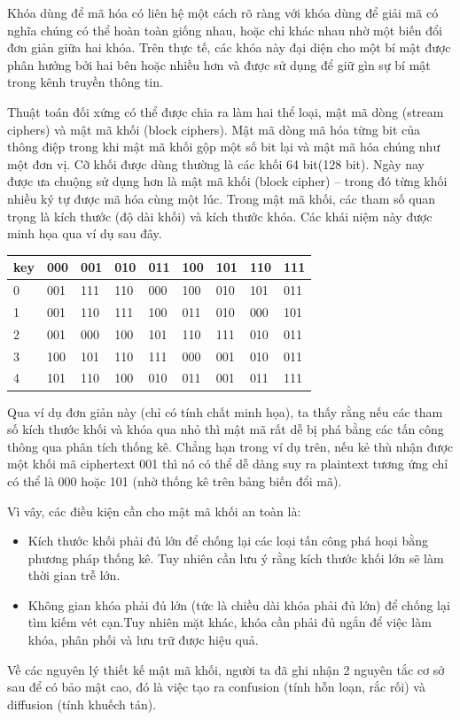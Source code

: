 \documentclass[a4paper,12pt]{report}
\begin{document}
Khóa dùng để mã hóa có liên hệ một cách rõ ràng với khóa dùng để giải mã có nghĩa chúng có thể hoàn toàn giống nhau, hoặc chỉ khác nhau nhờ một biến đổi đơn giản giữa hai khóa. Trên thực tế, các khóa này đại diện cho một bí mật được phân hưởng bởi hai bên hoặc nhiều hơn và được sử dụng để giữ gìn sự bí mật trong kênh truyền thông tin.

Thuật toán đối xứng có thể được chia ra làm hai thể loại, mật mã dòng (stream ciphers) và mật mã khối (block ciphers). Mật mã dòng mã hóa từng bit của thông điệp trong khi mật mã khối gộp một số bit lại và mật mã hóa chúng như một đơn vị. Cỡ khối được dùng thường là các khối 64 bit(128 bit). Ngày nay được ưa chuộng sử dụng hơn là mật mã khối (block cipher) -- trong đó từng khối nhiều ký tự được mã hóa cùng một lúc. Trong mật mã khối, các tham số quan trọng là kích thước (độ dài khối) và kích thước khóa. Các khái niệm này được minh họa qua ví dụ sau đây.
\begin{center}
\begin{tabular}{|l|l|l|l|l|l|l|l|l|}
\hline
key & 000 & 001 & 010 & 011 & 100 & 101 & 110 & 111 \\
\hline
0 & 001 & 111 & 110 & 000 & 100 & 010 & 101 & 011 \\
\hline
1 & 001 & 110 & 111 & 100 & 011 & 010 & 000 & 101 \\
\hline
2 & 001 & 000 & 100 & 101 & 110 & 111 & 010 & 011 \\
\hline
3 & 100 & 101 & 110 & 111 & 000 & 001 & 010 & 011 \\
\hline
4 & 101 & 110 & 100 & 010 & 011 & 001 & 011 & 111 \\
\hline
\end{tabular}
\end{center}

Qua ví dụ đơn giản này (chỉ có tính chất minh họa), ta thấy rằng nếu các
tham số kích thước khối và khóa qua nhỏ thì mật mã rất dễ bị phá bằng các tấn công thông qua phân tích thống kê. Chẳng hạn trong ví dụ trên, nếu kẻ thù nhận được một khối mã ciphertext 001 thì nó có thể dễ dàng suy ra plaintext tương ứng chỉ có thể là 000 hoặc 101 (nhờ thống kê trên bảng biến đổi mã).

Vì vây, các điều kiện cần cho mật mã khối an toàn là:
\begin{itemize}
\item Kích thước khối phải đủ lớn để chống lại các loại tấn công phá hoại bằng phương pháp thống kê. Tuy nhiên cần lưu ý rằng kích thước khối lớn sẽ làm thời gian trễ lớn.
\item Không gian khóa phải đủ lớn (tức là chiều dài khóa phải đủ lớn) để chống lại tìm kiếm vét cạn.Tuy nhiên mặt khác, khóa cần phải đủ ngắn để việc làm khóa, phân phối và lưu trữ được hiệu quả.	
\end{itemize}
Về các nguyên lý thiết kế mật mã khối, người ta đã ghi nhận 2 nguyên tắc cơ sở sau để có bảo mật cao, đó là việc tạo ra confusion (tính hỗn loạn, rắc rối) và diffusion (tính khuếch tán).
\end{document}

